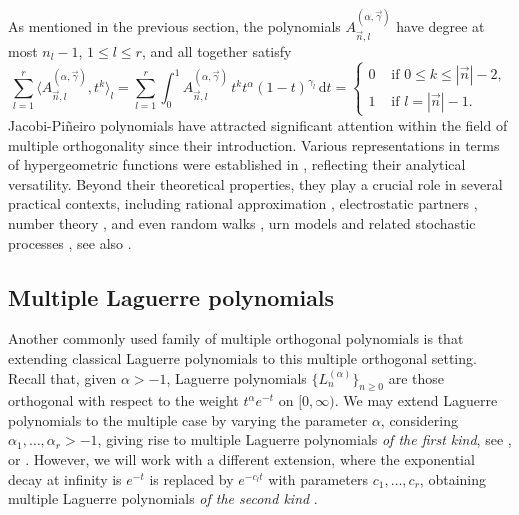 \documentclass[a4paper]{article}
\theoremstyle{plain}
\theoremstyle{definition}
\newcommand{\dr}{\mathrm{d}}
\begin{document}
As mentioned in the previous section, the polynomials $A^{(\alpha,\vec\gamma)}_{\vec n,l}$ have degree at most $n_l-1$, $1\leq l\leq r$, and all together satisfy 
\begin{equation}\label{eq:multiple-orthogonality-JP-type-i}
    \sum_{l=1}^r \langle A^{(\alpha,\vec\gamma)}_{\vec n,l},t^k \rangle_l =\sum_{l=1}^r\int_0^1A^{(\alpha,\vec\gamma)}_{\vec n,l}\,t^k t^{\alpha}(1-t)^{\gamma_l}\,\dr t =\begin{cases}
        0 & \text{ if } 0\leq k\leq |\vec n|-2,\\
        1  & \text{ if } l= |\vec n|-1.
    \end{cases}
\end{equation}
Jacobi-Pi\~neiro polynomials have attracted significant attention within the field of multiple orthogonality since their introduction. Various representations in terms of hypergeometric functions were established in \citep{ABVA03, BCVA05}, reflecting their analytical versatility. Beyond their theoretical properties, they play a crucial role in several practical contexts, including rational approximation \cite{Apt98, VA20}, electrostatic partners \cite{MFOSL22}, number theory \cite{Fis04}, and even random walks \cite{BDFMAF23}, urn models \cite{GI21} and related stochastic processes \citep{BDFM25}, see also \cite{MFVA16}.


\subsection{Multiple Laguerre polynomials}\label{subsec:Laguerre-MOP}

Another commonly used family of multiple orthogonal polynomials is that extending classical Laguerre polynomials to this multiple orthogonal setting. Recall that, given $\alpha>-1$, Laguerre polynomials $\{L_n^{(\alpha)}\}_{n\geq 0}$ are those orthogonal with respect to the weight $t^\alpha e^{-t}$ on $[0,\infty)$. We may extend Laguerre polynomials to the multiple case by varying the parameter $\alpha$, considering $\alpha_1,\dots,\alpha_r>-1$, giving rise to multiple Laguerre polynomials \emph{of the first kind}, see \cite[Section 3.2]{ABVA03}, \cite[Section 23.4.1]{Ism05} or \cite[Section 3.6.1]{VA20}. However, we will work with a different extension, where the exponential decay at infinity is $e^{-t}$ is replaced by $e^{-c_l t}$ with parameters $c_1,\dots,c_r$, obtaining multiple Laguerre polynomials \emph{of the second kind} \cite[Section 3.1]{BK05}. 
\end{document}
